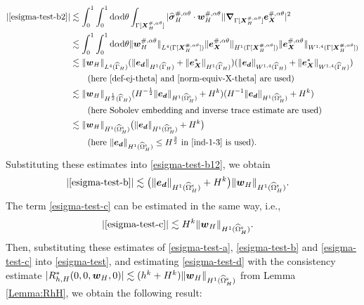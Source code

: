 \documentclass[11pt,reqno]{amsart}
\theoremstyle{definition}
\theoremstyle{plain}
\numberwithin{theorem}{section}
\numberwithin{proposition}{section}
\numberwithin{lemma}{section}
\numberwithin{equation}{section}
\newcommand{\bs}[1]{\boldsymbol{#1}}
\newcommand{\uu}[1]  {{\bs{#1}} }
\newcommand{\grad}   { \uu{\nabla}    }
\def\d{\mathrm{d}}
\renewcommand{\(}{\bigl(}
\renewcommand{\)}{\bigr)}
\begin{document}
\begin{align}
|\eqref{esigma-test-b2}|
&\lesssim \int_0^1\int_0^1\d\alpha\d\theta \int_{\Gamma[\bs X_H^{\#,\alpha\theta}]} |{\widehat{\bs\sigma}}_H^{\#,\alpha\theta}\cdot {\bs w}_H^{\#,\alpha\theta}| |\grad_{\Gamma[\bs X_H^{\#,\alpha\theta}]}{\bs e}_{\bs X}^{\#,\alpha\theta}|^2 \notag\\
&\lesssim \int_0^1\int_0^1\d\alpha\d\theta \|{\bs w}_H^{\#,\alpha\theta}\|_{L^4(\Gamma[\bs X_H^{\#,\alpha\theta}])} \|{\bs e}_{\bs X}^{\#,\alpha\theta}\|_{H^1(\Gamma[\bs X_H^{\#,\alpha\theta}])} 
\|{\bs e}_{\bs X}^{\#,\alpha\theta}\|_{W^{1,4}(\Gamma[\bs X_H^{\#,\alpha\theta}])} \notag\\
&\lesssim \|{\bs w}_H\|_{L^4(\widehat\Gamma_H)} 
(\|{\bs e}_{\bs d}\|_{H^1(\widehat\Gamma_H)} +\|{\bs e}_{\bs X}^*\|_{H^1(\widehat\Gamma_H)} )
(\|{\bs e}_{\bs d}\|_{W^{1,4}(\widehat\Gamma_H)} +\|{\bs e}_{\bs X}^*\|_{W^{1,4}(\widehat\Gamma_H)})\notag\\
&\qquad \mbox{(here \eqref{def-ej-theta} and \eqref{norm-equiv-X-theta} are used)}\notag\\
&\lesssim \|{\bs w}_H\|_{H^{\frac12}(\widehat\Gamma_H)} 
(H^{-\frac12}\|{\bs e}_{\bs d}\|_{H^1(\widehat\Omega^{\rm s}_H)} + H^k)
(H^{-1}\|{\bs e}_{\bs d}\|_{H^1(\widehat\Omega^{\rm s}_H)} +H^k)\notag\\
&\qquad\mbox{(here Sobolev embedding and inverse trace estimate are used)}\notag\\
&\lesssim \|{\bs w}_H\|_{H^1(\widehat\Omega^{\rm s}_H)} 
\big(\|{\bs e}_{\bs d}\|_{H^1(\widehat\Omega^{\rm s}_H)} + H^k \big)\notag\\
&\qquad\mbox{(here $\|{\bs e}_{\bs d}\|_{H^1(\widehat\Omega^{\rm s}_H)} \le H^{\frac32}$ in \eqref{ind-1-3} is used)} . 
\end{align}
Substituting these estimates into \eqref{esigma-test-b12}, we obtain 
\begin{align}
|\eqref{esigma-test-b}|
&\lesssim \big( \|{\bs e}_{\bs d}\|_{H^1(\widehat\Omega^{\rm s}_H)} + H^k \big)
\|{\bs w}_H\|_{H^1(\widehat\Omega^{\rm s}_H)} .
\end{align}
The term \eqref{esigma-test-c} can be estimated in the same way, i.e., 
\begin{align}
|\eqref{esigma-test-c}|
&\lesssim H^k \|{\bs w}_H\|_{H^1(\widehat\Omega^{\rm s}_H)} .
\end{align}
Then, substituting these estimates of \eqref{esigma-test-a}, \eqref{esigma-test-b} and \eqref{esigma-test-c} into \eqref{esigma-test}, and estimating \eqref{esigma-test-d} with the consistency estimate $|R_{h,H}^*(0, 0, \bs w_H, 0)|\lesssim (h^k+H^k)\|{\bs w}_H\|_{H^1(\widehat\Omega^{\rm s}_H)}$ from Lemma \ref{Lemma:RhH}, we obtain the following result: 
\end{document}
